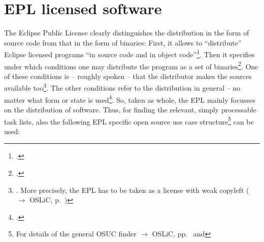 %
%
%
%
%



\section{EPL licensed software}

The Eclipse Public License clearly distinguishes the distribution in the form of
source code from that in the form of binaries: First, it allows to
\enquote{distribute} Eclipse licensed programs \enquote{in source code and in
object code}\footcite[cf.][\nopage wp.\ §3]{Epl10OsiLicense2005a}. Then it
specifies under which conditions one may distribute the program as a set of
binaries\footcite[cf.][\nopage wp.\ §3 top area]{Epl10OsiLicense2005a}. One of
these conditions is -- roughly spoken -- that the distributor makes the sources
available too\footnote{\cite[cf.][\nopage wp.\ §3 mid
area]{Epl10OsiLicense2005a}. More precisely, the EPL has to be taken as a
license with weak copyleft ($\rightarrow$ OSLiC, p.\
\pageref{sec:ProtectingPowerOfEpl})}. The other conditions refer to the
distribution in general -- no matter what form or state is
used\footcite[cf.][\nopage wp.\ §3 bottom area]{Epl10OsiLicense2005a}. So, taken
as whole, the EPL mainly focusses on the distribution of software. Thus, for
finding the relevant, simply processable task lists, also the following EPL
specific open source use case structure\footnote{For details of the general OSUC
finder $\rightarrow$ OSLiC, pp.\ \pageref{OsucTokens} and
\pageref{OsucDefinitionTree}} can be used:
 
